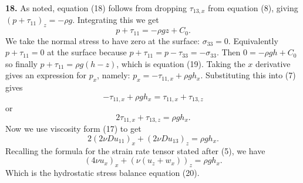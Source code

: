 \documentclass[10pt]{amsart}
\newcommand{\prob}[1]{\bigskip\noindent\large\textbf{#1.}\normalsize }
\begin{document}
\prob{18}  As noted, equation (18) follows from dropping $\tau_{13,x}$ from equation (8), giving $(p+\tau_{11})_z = -\rho g$.  Integrating this we get
    $$p+\tau_{11} = -\rho g z + C_0.$$
We take the normal stress to have zero at the surface: $\sigma_{33} = 0$.  Equivalently $p+\tau_{11}=0$ at the surface because $p+\tau_{11} = p-\tau_{33} = -\sigma_{33}$.  Then $0=-\rho g h + C_0$ so finally $p + \tau_{11} = \rho g (h-z)$, which is equation (19).  Taking the $x$ derivative gives an expression for $p_x$, namely: $p_x = -\tau_{11,x} + \rho g h_x$.  Substituting this into (7) gives
    $$-\tau_{11,x} + \rho g h_x = \tau_{11,x} + \tau_{13,z}$$
or
    $$2 \tau_{11,x} + \tau_{13,z} = \rho g h_x.$$
Now we use viscosity form (17) to get
    $$2 \left(2 \nu Du_{11}\right)_x + \left(2 \nu Du_{13}\right)_z = \rho g h_x.$$
Recalling the formula for the strain rate tensor stated after (5), we have
    $$\left(4 \nu u_x\right)_x + \left(\nu (u_z + w_x)\right)_z = \rho g h_x.$$
Which is the hydrostatic stress balance equation (20).
\end{document}

